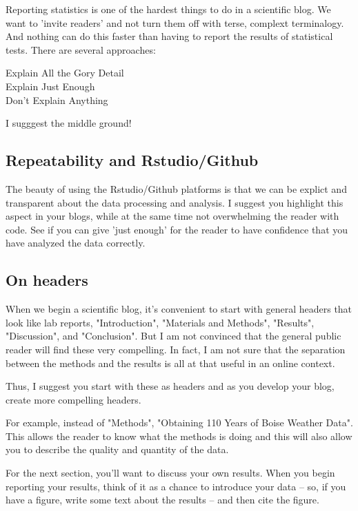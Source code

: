 \documentclass{tufte-handout}\usepackage[]{graphicx}\usepackage[]{color}
\begin{document}
Reporting statistics is one of the hardest things to do in a scientific blog. We want to 'invite readers' and not turn them off with terse, complext terminalogy. And nothing can do this faster than having to report the results of statistical tests. There are several approaches:

\begin{description}
\item[Explain All the Gory Detail]
\item[Explain Just Enough]
\item[Don't Explain Anything]

\end{description}

I sugggest the middle ground!

\subsection{Repeatability and Rstudio/Github}

The beauty of using the Rstudio/Github platforms is that we can be explict and transparent about the data processing and analysis. I suggest you highlight this aspect in your blogs, while at the same time not overwhelming the reader with code. See if you can give 'just enough' for the reader to have confidence that you have analyzed the data correctly. 

\subsection{On headers}

When we begin a scientific blog, it's convenient to start with general headers that look like lab reports, "Introduction", "Materials and Methods", "Results", "Discussion", and "Conclusion". But I am not convinced that the general public reader will find these very compelling. In fact, I am not sure that the separation between the methods and the results is all at that useful in an online context. 

Thus, I suggest you start with these as headers and as you develop your blog, create more compelling headers. 

For example, instead of "Methods", "Obtaining 110 Years of Boise Weather Data". This allows the reader to know what the methods is doing and this will also allow you to describe the quality and quantity of the data. 

For the next section, you'll want to discuss your own results. When you begin reporting your results, think of it as a chance to introduce your data -- so, if you have a figure, write some text about the results -- and then cite the figure.
\end{document}
